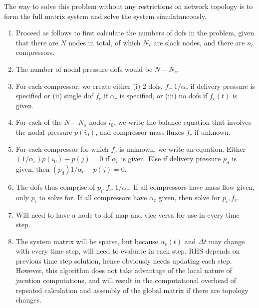\documentclass{amsart}
\begin{document}
The way to solve this problem without any restrictions on network topology is to form the full matrix system and solve the system simulataneously.
\begin{enumerate}
\item Proceed as follows to first calculate the numbers of dofs in the problem, given that there are $N$ nodes in total, of which $N_s$ are slack nodes, and there are $n_c$ compressors.
\item The number of nodal pressure dofs would be $N - N_s$. 
\item For each compressor, we create either (i) 2 dofs, $f_c, 1/\alpha_c$ if delivery pressure is specified or (ii) single dof $f_c$ if $\alpha_c$ is specified, or (iii) no dofs if $f_c(t)$ is given.
\item For each of the $N- N_s$ nodes $i_0$, we write the balance equation that involves the nodal pressure $p(i_0)$, and compressor mass fluxes $f_c$ if unknown. 
\item For each compressor for which $f_c$ is unknown, we write an equation. Either $(1/\alpha_c)p(i_0) - p(j) = 0$ if $\alpha_c$ is given. Else if delivery pressure $p_d$ is given, then $(p_d)1/\alpha_c - p(j) = 0$.
\item The dofs thus comprise of $p_i, f_c, 1/\alpha_c$. If all compressors have mass flow given, only $p_i$ to solve for. If all compressors have $\alpha_c$ given, then solve for $p_i, f_c$.
\item Will need to have a node to dof map and vice versa for use in every time step.
\item The system matrix will be sparse, but because $\alpha_c(t)$ and $\Delta t$ may change with every time step, will need to evaluate in each step. RHS depends on previous time step solution, hence obviously needs updating each step.
However, this algorithm does not take advantage of the local nature  of jucntion computations, and will result in the computational overhead  of repeated calculation and assembly of the global matrix if there are topology changes.
\end{enumerate}
\end{document}
